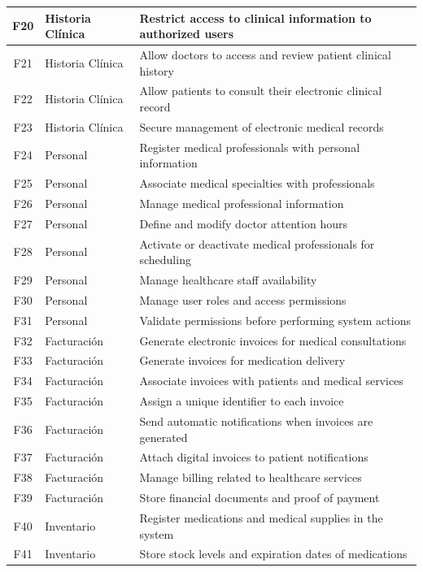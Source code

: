 \documentclass{prgrado}
\begin{document}
\begin{longtable}{|c|l|p{9cm}|}
F20 & Historia Clínica & Restrict access to clinical information to authorized users \\ \hline
F21 & Historia Clínica & Allow doctors to access and review patient clinical history \\ \hline
F22 & Historia Clínica & Allow patients to consult their electronic clinical record \\ \hline
F23 & Historia Clínica & Secure management of electronic medical records \\ \hline
F24 & Personal & Register medical professionals with personal information \\ \hline
F25 & Personal & Associate medical specialties with professionals \\ \hline
F26 & Personal & Manage medical professional information \\ \hline
F27 & Personal & Define and modify doctor attention hours \\ \hline
F28 & Personal & Activate or deactivate medical professionals for scheduling \\ \hline
F29 & Personal & Manage healthcare staff availability \\ \hline
F30 & Personal & Manage user roles and access permissions \\ \hline
F31 & Personal & Validate permissions before performing system actions \\ \hline
F32 & Facturación & Generate electronic invoices for medical consultations \\ \hline
F33 & Facturación & Generate invoices for medication delivery \\ \hline
F34 & Facturación & Associate invoices with patients and medical services \\ \hline
F35 & Facturación & Assign a unique identifier to each invoice \\ \hline
F36 & Facturación & Send automatic notifications when invoices are generated \\ \hline
F37 & Facturación & Attach digital invoices to patient notifications \\ \hline
F38 & Facturación & Manage billing related to healthcare services \\ \hline
F39 & Facturación & Store financial documents and proof of payment \\ \hline
F40 & Inventario & Register medications and medical supplies in the system \\ \hline
F41 & Inventario & Store stock levels and expiration dates of medications \\ \hline

\end{longtable}
\end{document}
